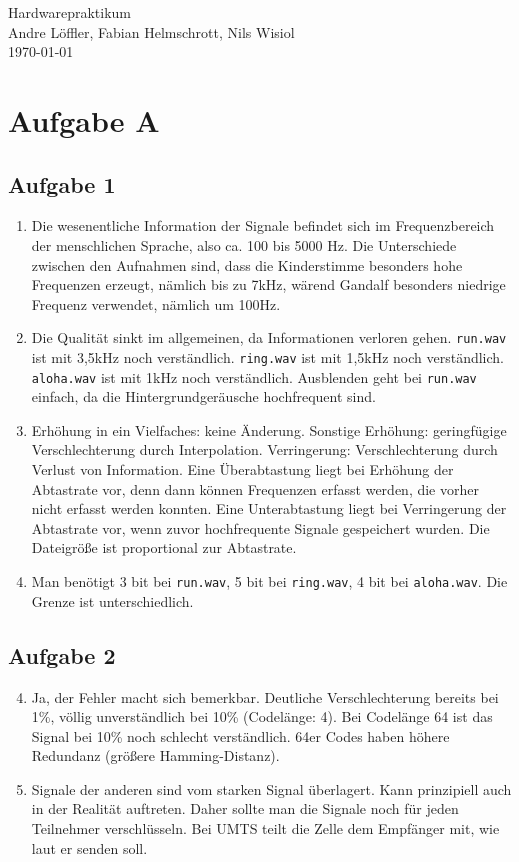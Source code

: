 \documentclass[a4paper,10pt]{scrartcl}
\begin{document}
\begin{center}
  \Huge Hardwarepraktikum \\
  \large Andre Löffler, Fabian Helmschrott, Nils Wisiol \\
  \today
\end{center}


\section*{Aufgabe A}

\subsection*{Aufgabe 1}
\begin{enumerate}
 \item Die wesenentliche Information der Signale befindet sich im Frequenzbereich der menschlichen Sprache, also ca. 100 bis 5000 Hz. Die Unterschiede zwischen den Aufnahmen sind, dass die Kinderstimme besonders hohe Frequenzen erzeugt, nämlich bis zu 7kHz, wärend Gandalf besonders niedrige Frequenz verwendet, nämlich um 100Hz.
 \item Die Qualität sinkt im allgemeinen, da Informationen verloren gehen. \texttt{run.wav} ist mit 3,5kHz noch verständlich. \texttt{ring.wav} ist mit 1,5kHz noch verständlich. \texttt{aloha.wav} ist mit 1kHz noch verständlich. Ausblenden geht bei \texttt{run.wav} einfach, da die Hintergrundgeräusche hochfrequent sind.
 \item Erhöhung in ein Vielfaches: keine Änderung. Sonstige Erhöhung: geringfügige Verschlechterung durch Interpolation. Verringerung: Verschlechterung durch Verlust von Information. Eine Überabtastung liegt bei Erhöhung der Abtastrate vor, denn dann können Frequenzen erfasst werden, die vorher nicht erfasst werden konnten. Eine Unterabtastung liegt bei Verringerung der Abtastrate vor, wenn zuvor hochfrequente Signale gespeichert wurden. Die Dateigröße ist proportional zur Abtastrate.
 \item Man benötigt 3 bit bei \texttt{run.wav}, 5 bit bei \texttt{ring.wav}, 4 bit bei \texttt{aloha.wav}. Die Grenze ist unterschiedlich.
\end{enumerate}

\subsection*{Aufgabe 2}
\begin{enumerate}
 \setcounter{enumi}{3}
 \item Ja, der Fehler macht sich bemerkbar. Deutliche Verschlechterung bereits bei 1\%, völlig unverständlich bei 10\% (Codelänge: 4). Bei Codelänge 64 ist das Signal bei 10\% noch schlecht verständlich. 64er Codes haben höhere Redundanz (größere Hamming-Distanz).
 \item Signale der anderen sind vom starken Signal überlagert. Kann prinzipiell auch in der Realität auftreten. Daher sollte man die Signale noch für jeden Teilnehmer verschlüsseln. Bei UMTS teilt die Zelle dem Empfänger mit, wie laut er senden soll.
\end{enumerate}
\end{document}
